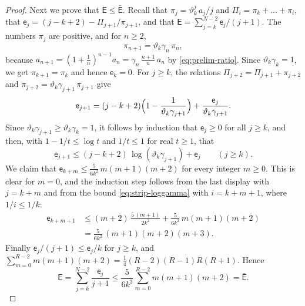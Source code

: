 \documentclass{amsart}
\theoremstyle{definition}
\theoremstyle{remark}
\numberwithin{equation}{section}
\begin{document}
\begin{proof}
Next we prove that $\mathsf E\le\bar{\mathsf E}$. Recall that $\pi_j=\vartheta_k^j\,a_j/j$ and $\Pi_i=\pi_k+\dots+\pi_i$, that $\mathsf e_j=(j-k+2)-\Pi_{j+1}/\pi_{j+1}$, and that $\mathsf E=\sum_{j=k}^{N-2}\mathsf e_j/(j+1)$. The numbers $\pi_j$ are positive, and for $n\ge 2$,
\[
\pi_{n+1}=\vartheta_k\gamma_n\,\pi_n,
\]
because $a_{n+1}=(1+\frac1n)^{n-1}a_n=\gamma_n\,\frac{n+1}{n}\,a_n$ by \eqref{eq:prelim-ratio}. Since $\vartheta_k\gamma_k=1$, we get $\pi_{k+1}=\pi_k$ and hence $\mathsf e_k=0$. For $j\ge k$, the relations $\Pi_{j+2}=\Pi_{j+1}+\pi_{j+2}$ and $\pi_{j+2}=\vartheta_k\gamma_{j+1}\,\pi_{j+1}$ give
\[
\mathsf e_{j+1}=(j-k+2)\Bigl(1-\frac{1}{\vartheta_k\gamma_{j+1}}\Bigr)+\frac{\mathsf e_j}{\vartheta_k\gamma_{j+1}}.
\]
Since $\vartheta_k\gamma_{j+1}\ge\vartheta_k\gamma_k=1$, it follows by induction that $\mathsf e_j\ge 0$ for all $j\ge k$, and then, with $1-1/t\le\log t$ and $1/t\le 1$ for real $t\ge 1$, that
\begin{equation}\label{eq:strip-step}
\mathsf e_{j+1}\le(j-k+2)\,\log(\vartheta_k\gamma_{j+1})+\mathsf e_j\qquad(j\ge k).
\end{equation}
We claim that $\mathsf e_{k+m}\le\frac{5}{6k^2}\,m(m+1)(m+2)$ for every integer $m\ge 0$. This is clear for $m=0$, and the induction step follows from the last display with $j=k+m$ and from the bound \eqref{eq:strip-loggamma} with $i=k+m+1$, where $1/i\le 1/k$:
\begin{align*}
\mathsf e_{k+m+1}&\le(m+2)\,\frac{5\,(m+1)}{2k^2}+\frac{5}{6k^2}\,m(m+1)(m+2)\\
&=\frac{5}{6k^2}\,(m+1)(m+2)(m+3).
\end{align*}
Finally $\mathsf e_j/(j+1)\le\mathsf e_j/k$ for $j\ge k$, and $\sum_{m=0}^{R-2}m(m+1)(m+2)=\frac14(R-2)(R-1)R(R+1)$. Hence
\[
\mathsf E=\sum_{j=k}^{N-2}\frac{\mathsf e_j}{j+1}\le\frac{5}{6k^3}\sum_{m=0}^{R-2}m(m+1)(m+2)=\bar{\mathsf E}.
\]


\end{proof}
\end{document}
